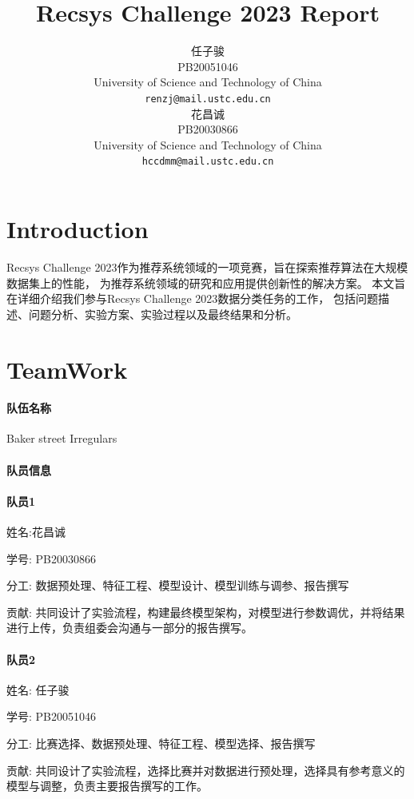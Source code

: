 \documentclass{article}
\title{Recsys Challenge 2023 Report}
\author{
 任子骏 \\
  PB20051046\\
  University of Science and Technology of China\\
  \texttt{renzj@mail.ustc.edu.cn} \\
   \And
 花昌诚 \\
  PB20030866\\
  University of Science and Technology of China\\
  \texttt{hccdmm@mail.ustc.edu.cn} \\
}
\begin{document}
\maketitle



\section{Introduction}

Recsys Challenge 2023作为推荐系统领域的一项竞赛，旨在探索推荐算法在大规模数据集上的性能，
为推荐系统领域的研究和应用提供创新性的解决方案。
本文旨在详细介绍我们参与Recsys Challenge 2023数据分类任务的工作，
包括问题描述、问题分析、实验方案、实验过程以及最终结果和分析。

\section{TeamWork}
\paragraph*{队伍名称} Baker street Irregulars

\paragraph*{队员信息}

\paragraph*{队员1}

姓名:花昌诚

学号: PB20030866

分工: 数据预处理、特征工程、模型设计、模型训练与调参、报告撰写

贡献: 共同设计了实验流程，构建最终模型架构，对模型进行参数调优，并将结果进行上传，负责组委会沟通与一部分的报告撰写。

\paragraph*{队员2}

姓名: 任子骏

学号: PB20051046

分工: 比赛选择、数据预处理、特征工程、模型选择、报告撰写

贡献: 共同设计了实验流程，选择比赛并对数据进行预处理，选择具有参考意义的模型与调整，负责主要报告撰写的工作。
\end{document}
